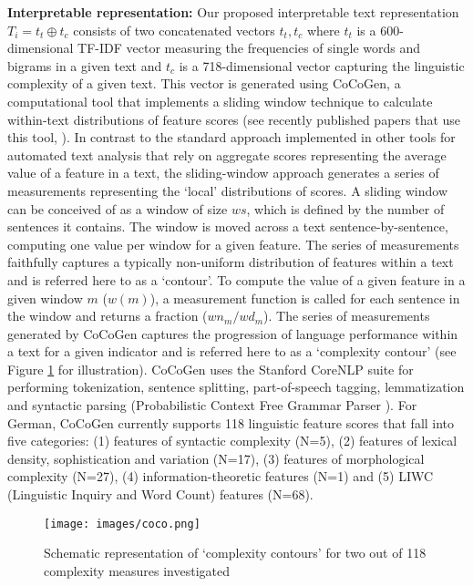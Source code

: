 \documentclass[11pt]{article}
\begin{document}
\textbf{Interpretable representation:} Our proposed interpretable text representation \(T_i = t_t \oplus t_c\) consists of two concatenated vectors \(t_t, t_c\) where \(t_t\) is a 600-dimensional TF-IDF vector measuring the frequencies of single words and bigrams in a given text and \(t_c\) is a 718-dimensional vector capturing the linguistic complexity of a given text. This vector is generated using CoCoGen, a computational tool that implements a sliding window technique to calculate within-text distributions of feature scores (see recently published papers that use this tool, \cite{strobel2018text,kerz2020becoming,kerz2020understanding,qiao-etal-2020-language}). In contrast to the standard approach implemented in other tools for automated text analysis that rely on aggregate scores representing the average value of a feature in a text, the sliding-window approach generates a series of measurements representing the `local' distributions of scores. A sliding window can be conceived of as a window of size $ws$, which is defined by the number of sentences it contains. The window is moved across a text sentence-by-sentence, computing one value per window for a given feature.  The series of measurements faithfully captures a typically non-uniform distribution of features within a text and is referred here to as a `contour'. To compute the value of a given feature in a given window $m$ ($w(m)$), a measurement function is called for each sentence in the window and returns a fraction ($wn_{m}/wd_{m}$). 
The series of measurements generated by CoCoGen captures the progression of language performance within a text for a given indicator and is referred here to as a `complexity contour' (see Figure  \ref{fig:coco} for illustration). CoCoGen uses the Stanford CoreNLP suite \cite{Manning14thestanford} for performing tokenization, sentence splitting, part-of-speech tagging, lemmatization and syntactic parsing (Probabilistic Context Free Grammar Parser \cite{klein2003accurate}). For German, CoCoGen currently supports 118 linguistic feature scores that fall into five categories: (1) features of syntactic complexity (N=5), (2) features of lexical density, sophistication and variation (N=17), (3) features of morphological complexity (N=27), (4) information-theoretic features (N=1) and (5) LIWC (Linguistic Inquiry and Word Count) \citep{doi:10.1177/0261927X09351676} features (N=68).

\begin{figure}
    \centering
    \texttt{[image: images/coco.png]}
    \caption{Schematic representation of `complexity contours' for two out of 118 complexity measures investigated}
    \label{fig:coco}
    \vspace{-5mm}
\end{figure}
\end{document}
